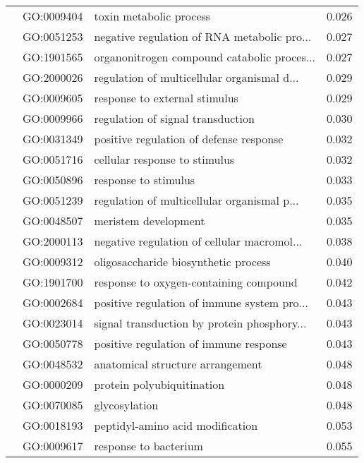 \begin{longtable}{lllr}
   & GO:0009404 &                      toxin metabolic process &         0.026 \\
   & GO:0051253 &  negative regulation of RNA metabolic pro... &         0.027 \\
   & GO:1901565 &  organonitrogen compound catabolic proces... &         0.027 \\
   & GO:2000026 &  regulation of multicellular organismal d... &         0.029 \\
   & GO:0009605 &                response to external stimulus &         0.029 \\
   & GO:0009966 &            regulation of signal transduction &         0.030 \\
   & GO:0031349 &      positive regulation of defense response &         0.032 \\
   & GO:0051716 &                cellular response to stimulus &         0.032 \\
   & GO:0050896 &                         response to stimulus &         0.033 \\
   & GO:0051239 &  regulation of multicellular organismal p... &         0.035 \\
   & GO:0048507 &                         meristem development &         0.035 \\
   & GO:2000113 &  negative regulation of cellular macromol... &         0.038 \\
   & GO:0009312 &         oligosaccharide biosynthetic process &         0.040 \\
   & GO:1901700 &       response to oxygen-containing compound &         0.042 \\
   & GO:0002684 &  positive regulation of immune system pro... &         0.043 \\
   & GO:0023014 &  signal transduction by protein phosphory... &         0.043 \\
   & GO:0050778 &       positive regulation of immune response &         0.043 \\
   & GO:0048532 &             anatomical structure arrangement &         0.048 \\
   & GO:0000209 &                   protein polyubiquitination &         0.048 \\
   & GO:0070085 &                                glycosylation &         0.048 \\
   & GO:0018193 &             peptidyl-amino acid modification &         0.053 \\
   & GO:0009617 &                        response to bacterium &         0.055 \\

\end{longtable}
